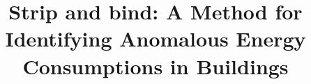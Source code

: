 \documentclass{sig-alternate-ipsn13}
\title{Strip and bind: A Method for Identifying Anomalous Energy Consumptions in Buildings}
\begin{document}
\maketitle



















\small


\end{document}

